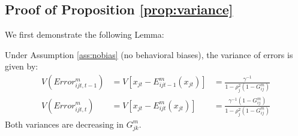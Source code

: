 \subsection{Proof of Proposition \ref{prop:variance}}
\label{proof:variance}

We first demonstrate the following Lemma:

\begin{lemma}\label{lemma:variance} Under Assumption \ref{ass:nobias} (no behavioral biases), the variance of errors is given by:
\begin{equation}\begin{array}{lll}V(Error_{ijt,t-1}^m)&=V[x_{jt}-E_{ijt-1}^m(x_{jt})]&=\frac{\gamma^{-1}}{1-\rho_{j}^2(1-G_{ij}^m)}\\
																 V(Error_{ijt,t}^m)&=V[x_{jt}-E_{ijt}^m(x_{jt})]&=\frac{\gamma^{-1}(1-G_{ij}^m)}{1-\rho_{j}^2(1-G_{ij}^m)}
																\end{array}\label{eq:variance}\end{equation}
Both variances are decreasing in $G_{jk}^m$.
\end{lemma}

